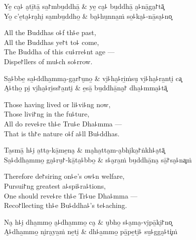 \begin{twochants}
  Ye̱ ca̮꜕ a̮tī̱tā̱ sa̱꜓mbu̱ddhā̱ & ye̱ ca̮꜕ bu̱ddhā̱ a̮꜕nā̱ga̮꜓tā͓ \\
  Yo̱ c'e̱ta̮꜕ra̮hi̮ sa̱mbu̱ddho̱ & ba̮꜕hu̱nna̱ṁ so̱꜕ka̮꜕-nā̱sa̮꜕no͓ \\
\end{twochants}

\begin{english}
  All the Buddhas o꜕f th꜕e past,\\
  All the Buddhas ye꜓t to꜕ come,\\
  The Buddha of this cu꜕rre꜕nt age ---\\
  Dispe꜓llers of mu꜕ch so꜕rrow.
\end{english}

\begin{twochants}
  Sa̱꜕bbe̱ sa̱꜕ddha̱mma̮-ga̮r꜓u̮no̱ & vi̮꜕ha̮꜕ri̱ṁsu̮ vi̮꜕ha̮꜕ra̱nti̮ ca͓ \\
  A̮꜕tho̱ pi̮ vi̮ha̮꜕ri̱ss꜓a̱nti̮ & e̱sā̱ bu̱ddhā̱na̮꜓ dha̱꜕mma̮꜕tā͓ \\
\end{twochants}

\begin{english}
  Those having lived or li꜕vi꜕ng now,\\
  Those livi꜓ng in the fu꜕ture,\\
  All do reve꜕re th꜕e Tru꜕e Dha꜕mma ---\\
  That is th꜓e nature o꜕f a꜕ll Bu꜕ddhas.
\end{english}

\begin{twochants}
  Ta̱smā̱ h꜕i̮ a̱tta̮-kā̱me̱na̮ & ma̮ha̱tta̮m-a̮bhi̮ka̱꜓ṅkh꜕a̮tā͓ \\
  Sa̱꜕ddha̱mmo̱ ga̮꜕ru̮꜓-kā̱ta̱꜕bbo̱ & s꜕a̮ra̱ṁ bu̱ddhā̱na̮ sā̱꜓sa̮꜕na͓ṁ \\
\end{twochants}

\begin{english}
  Therefore de꜓siring on꜕e's ow꜕n welfare,\\
  Pursui꜓ng greatest a꜕spi꜕ra꜕tions,\\
  One should reve꜕re th꜕e Tr꜕ue Dha꜕mma ---\\
  Reco꜓llecting th꜕e Bu꜕ddha꜕'s te꜕aching.
\end{english}

\clearpage

\begin{twochants}
  Na̮ h꜕i̮ dha̱mmo̱ a̮꜕dha̱mmo̱ ca̮ & u̮bho̱ s꜕a̮ma̮-vi̮pā̱ki̮꜓no͓ \\
  A̮꜕dha̱mmo̱ ni̮ra̮ya̱ṁ ne̱ti̮ & dh꜕a̱mmo̱ pā̱pe̱ti̮꜕ su̱꜕gga̮꜕ti͓ṁ \\
\end{twochants}


